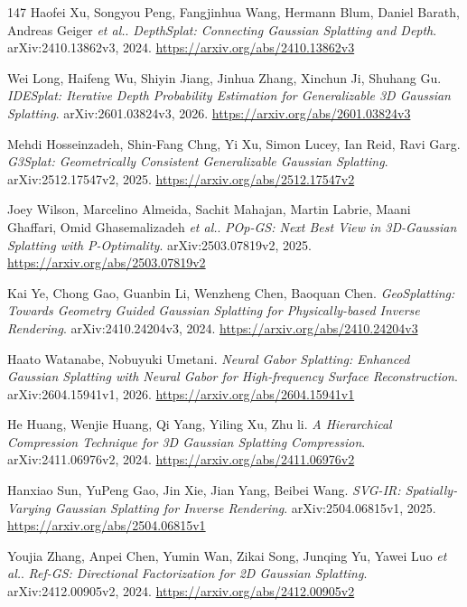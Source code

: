 \documentclass[11pt,a4paper]{article}
\begin{document}
\begin{thebibliography}{147}
Haofei Xu, Songyou Peng, Fangjinhua Wang, Hermann Blum, Daniel Barath, Andreas Geiger \emph{et al.}.
\newblock \emph{DepthSplat: Connecting Gaussian Splatting and Depth}.
\newblock arXiv:2410.13862v3, 2024.
\newblock \url{https://arxiv.org/abs/2410.13862v3}

Wei Long, Haifeng Wu, Shiyin Jiang, Jinhua Zhang, Xinchun Ji, Shuhang Gu.
\newblock \emph{IDESplat: Iterative Depth Probability Estimation for Generalizable 3D Gaussian Splatting}.
\newblock arXiv:2601.03824v3, 2026.
\newblock \url{https://arxiv.org/abs/2601.03824v3}

Mehdi Hosseinzadeh, Shin-Fang Chng, Yi Xu, Simon Lucey, Ian Reid, Ravi Garg.
\newblock \emph{G3Splat: Geometrically Consistent Generalizable Gaussian Splatting}.
\newblock arXiv:2512.17547v2, 2025.
\newblock \url{https://arxiv.org/abs/2512.17547v2}

Joey Wilson, Marcelino Almeida, Sachit Mahajan, Martin Labrie, Maani Ghaffari, Omid Ghasemalizadeh \emph{et al.}.
\newblock \emph{POp-GS: Next Best View in 3D-Gaussian Splatting with P-Optimality}.
\newblock arXiv:2503.07819v2, 2025.
\newblock \url{https://arxiv.org/abs/2503.07819v2}

Kai Ye, Chong Gao, Guanbin Li, Wenzheng Chen, Baoquan Chen.
\newblock \emph{GeoSplatting: Towards Geometry Guided Gaussian Splatting for Physically-based Inverse Rendering}.
\newblock arXiv:2410.24204v3, 2024.
\newblock \url{https://arxiv.org/abs/2410.24204v3}

Haato Watanabe, Nobuyuki Umetani.
\newblock \emph{Neural Gabor Splatting: Enhanced Gaussian Splatting with Neural Gabor for High-frequency Surface Reconstruction}.
\newblock arXiv:2604.15941v1, 2026.
\newblock \url{https://arxiv.org/abs/2604.15941v1}

He Huang, Wenjie Huang, Qi Yang, Yiling Xu, Zhu li.
\newblock \emph{A Hierarchical Compression Technique for 3D Gaussian Splatting Compression}.
\newblock arXiv:2411.06976v2, 2024.
\newblock \url{https://arxiv.org/abs/2411.06976v2}

Hanxiao Sun, YuPeng Gao, Jin Xie, Jian Yang, Beibei Wang.
\newblock \emph{SVG-IR: Spatially-Varying Gaussian Splatting for Inverse Rendering}.
\newblock arXiv:2504.06815v1, 2025.
\newblock \url{https://arxiv.org/abs/2504.06815v1}

Youjia Zhang, Anpei Chen, Yumin Wan, Zikai Song, Junqing Yu, Yawei Luo \emph{et al.}.
\newblock \emph{Ref-GS: Directional Factorization for 2D Gaussian Splatting}.
\newblock arXiv:2412.00905v2, 2024.
\newblock \url{https://arxiv.org/abs/2412.00905v2}


\end{thebibliography}
\end{document}
